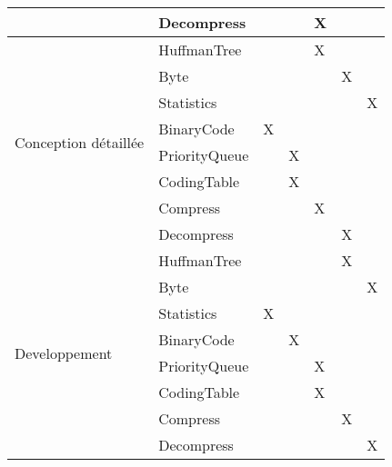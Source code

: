 \documentclass[12pt]{article}
\begin{document}
\begin{table}[]
{\begin{tabular}{|l|l|l|l|l|l|l|}
                & Decompress    &            &           & X        &            &            \\ \hline
                \multirow{8}{*}{Conception détaillée}    & HuffmanTree   &            &           & X        &            &            \\ \cline{2-7}
                & Byte          &            &           &          & X          &            \\ \cline{2-7}
                & Statistics    &            &           &          &            & X          \\ \cline{2-7}
                & BinaryCode    & X          &           &          &            &            \\ \cline{2-7}
                & PriorityQueue &            & X         &          &            &            \\ \cline{2-7}
                & CodingTable   &            & X         &          &            &            \\ \cline{2-7}
                & Compress      &            &           & X        &            &            \\ \cline{2-7}
                & Decompress    &            &           &          & X          &            \\ \hline
                \multirow{8}{*}{Developpement}           & HuffmanTree   &            &           &          & X          &            \\ \cline{2-7}
                & Byte          &            &           &          &            & X          \\ \cline{2-7}
                & Statistics    & X          &           &          &            &            \\ \cline{2-7}
                & BinaryCode    &            & X         &          &            &            \\ \cline{2-7}
                & PriorityQueue &            &           & X        &            &            \\ \cline{2-7}
                & CodingTable   &            &           & X        &            &            \\ \cline{2-7}
                & Compress      &            &           &          & X          &            \\ \cline{2-7}
                & Decompress    &            &           &          &            & X          \\ \hline

\end{tabular}}
\end{table}
\end{document}
